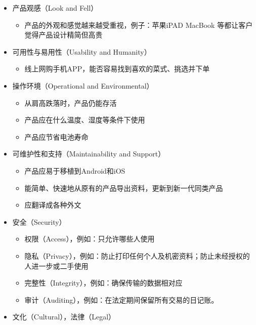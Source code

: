\begin{itemize}
\tightlist
\item
  产品观感（Look and Fell）

  \begin{itemize}
  \tightlist
  \item
    产品的外观和感觉越来越受重视，例子：苹果iPAD MacBook
    等都让客户觉得产品设计精简但高贵
  \end{itemize}
\item
  可用性与易用性（Usability and Humanity）

  \begin{itemize}
  \tightlist
  \item
    线上网购手机APP，能否容易找到喜欢的菜式、挑选并下单
  \end{itemize}
\item
  操作环境（Operational and Environmental）

  \begin{itemize}
  \tightlist
  \item
    从肩高跌落时，产品仍能存活
  \item
    产品应在什么温度、湿度等条件下使用
  \item
    产品应节省电池寿命
  \end{itemize}
\item
  可维护性和支持（Maintainability and Support）

  \begin{itemize}
  \tightlist
  \item
    产品应易于移植到Android和iOS
  \item
    能简单、快速地从原有的产品导出资料，更新到新一代同类产品
  \item
    应翻译成各种外文
  \end{itemize}
\item
  安全（Security）

  \begin{itemize}
  \tightlist
  \item
    权限（Access），例如：只允许哪些人使用
  \item
    隐私（Privacy），例如：防止打印任何个人及机密资料；防止未经授权的人进一步或二手使用
  \item
    完整性（Integrity），例如：确保传输的数据相对应
  \item
    审计（Auditing），例如：在法定期间保留所有交易的日记账。
  \end{itemize}
\item
  文化（Cultural），法律（Legal）
\end{itemize}

